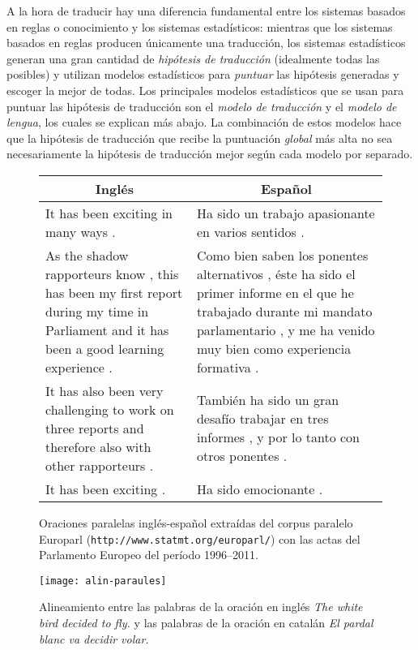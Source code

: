 A la hora de traducir hay una diferencia fundamental entre los sistemas basados en reglas o conocimiento y los sistemas estadísticos: mientras que los sistemas basados en reglas producen únicamente una traducción, los sistemas estadísticos generan una gran cantidad de \emph{hipótesis de traducción} (idealmente todas las posibles) y utilizan modelos estadísticos para \emph{puntuar} las hipótesis generadas y escoger la mejor de todas. Los principales modelos estadísticos que se usan para puntuar las hipótesis de traducción son el \emph{modelo de traducción} y el \emph{modelo de lengua}, los cuales se explican más abajo. La combinación de estos modelos hace que la hipótesis de traducción que recibe la puntuación \emph{global} más alta no sea necesariamente la hipótesis de traducción mejor según cada modelo por separado. 

\begin{figure} \centering

\begin{tabular}{p{6cm}|p{6cm}} \multicolumn{1}{c|}{\textbf{Inglés}} &\multicolumn{1}{c}{\textbf{Español}}\\ \hline

It has been exciting in many ways . &Ha sido un trabajo apasionante en varios sentidos . \\ \hline

As the shadow rapporteurs know , this has been my first report during my time in Parliament and it has been a good learning experience . &Como bien saben los ponentes alternativos , éste ha sido el primer informe en el que he trabajado durante mi mandato parlamentario , y me ha venido muy bien como experiencia formativa . \\ \hline

It has also been very challenging to work on three reports and therefore also with other rapporteurs . &También ha sido un gran desafío trabajar en tres informes , y por lo tanto con otros ponentes . \\ \hline

It has been exciting . &Ha sido emocionante . \\ \hline

\end{tabular} \caption{Oraciones paralelas inglés-español extraídas del corpus paralelo Europarl (\texttt{http://www.statmt.org/europarl/}) con las actas del Parlamento Europeo del período 1996--2011.} \label{fg:alinora} \end{figure} 

\begin{figure} \centering

\texttt{[image: alin-paraules]} \caption{Alineamiento entre las palabras de la oración en inglés \emph{The white bird decided to fly.} y las palabras de la oración en catalán \emph{El pardal blanc va decidir volar.}} \label{fg:alinpar} \end{figure} 

